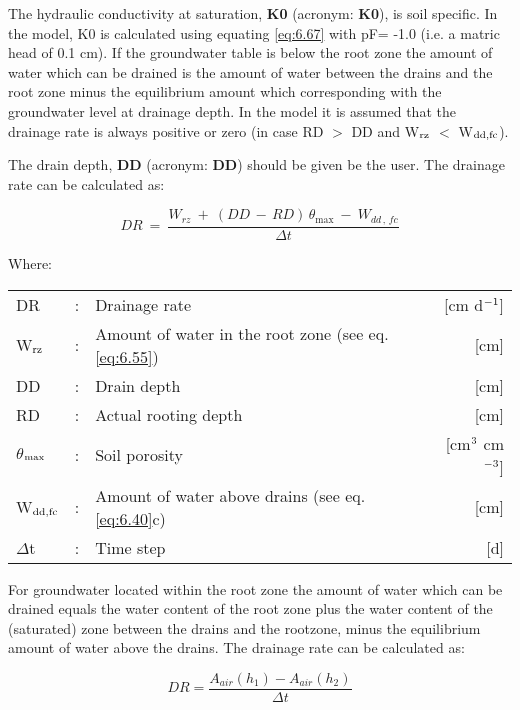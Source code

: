 The hydraulic conductivity at saturation, {\bf K0}  (acronym: {\bf K0}), is soil specific. In the
model, K0 is calculated using equating \ref{eq:6.67} with pF= -1.0 (i.e. a matric head of 0.1
cm). If the groundwater table is below the root zone the amount of water which can be
drained is the amount of water between the drains and the root zone minus the equilibrium 
amount which corresponding with the groundwater level at drainage depth. In the
model it is assumed that the drainage rate is always positive or zero (in case RD $>$ DD
and W$_{{\rm rz}}$ $<$ W$_{{\rm dd,fc}}$).

The drain depth, {\bf DD} (acronym: {\bf DD}) should be given be the user. The drainage rate can
be calculated as:

\begin{equation}
\label{eq:6.43}
DR ~=~{\frac{W _{rz} ~+~ (DD\, -\, RD)\, \theta _{\max } ~-~ W _{dd\, ,\, fc} }{\Delta t}}
\end{equation}

Where:\\[5pt]
\begin{tabularx}{\textwidth}{llXr}
DR &:& Drainage rate  & [cm d$^{{\rm -1}}$]\\
W$_{{\rm rz}}$ &:& Amount of water in the root zone (see eq. \ref{eq:6.55})  & [cm]\\
DD &:& Drain depth  & [cm]\\
RD &:& Actual rooting depth  & [cm]\\
$\theta$$_{{\rm max}}$ &:& Soil porosity  & [cm$^{{\rm 3}}$ cm$^{{\rm -3}}$]\\
W$_{{\rm dd,fc}}$ &:& Amount of water above drains (see eq. \ref{eq:6.40}c)  & [cm]\\
$\Delta$t &:& Time step  & [d]\\ 
\end{tabularx}

For groundwater located within the root zone the amount of water which can be drained
equals the water content of the root zone plus the water content of the (saturated) zone
between the drains and the rootzone, minus the equilibrium amount of water above the
drains. The drainage rate can be calculated as:

\begin{equation}
\label{eq:6.44}
DR = {\frac{A_{air} (h_{1}) - A_{air} (h_{2})}{\Delta t}}
\end{equation}

